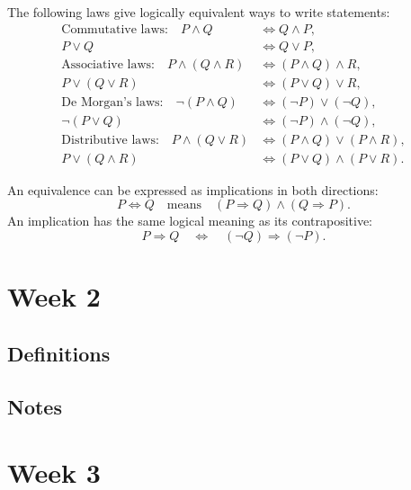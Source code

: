 \documentclass[12pt]{article}
\begin{document}
The following laws give logically equivalent ways to write statements:
\begin{align*}
\text{Commutative laws:}\quad
  P \land Q &\Leftrightarrow Q \land P,\\
  P \lor Q &\Leftrightarrow Q \lor P,\\
\text{Associative laws:}\quad
  P \land (Q \land R) &\Leftrightarrow (P \land Q) \land R,\\
  P \lor (Q \lor R) &\Leftrightarrow (P \lor Q) \lor R,\\
\text{De Morgan's laws:}\quad
  \neg(P \land Q) &\Leftrightarrow (\neg P) \lor (\neg Q),\\
  \neg(P \lor Q) &\Leftrightarrow (\neg P) \land (\neg Q),\\
\text{Distributive laws:}\quad
  P \land (Q \lor R) &\Leftrightarrow (P \land Q) \lor (P \land R),\\
  P \lor (Q \land R) &\Leftrightarrow (P \lor Q) \land (P \lor R).
\end{align*}

An equivalence can be expressed as implications in both directions:
\[
P \Leftrightarrow Q
\quad\text{means}\quad
(P \Rightarrow Q) \land (Q \Rightarrow P).
\]
An implication has the same logical meaning as its contrapositive:
\[
P \Rightarrow Q
\quad\Leftrightarrow\quad
(\neg Q) \Rightarrow (\neg P).
\]





\section{Week 2}

\subsection{Definitions}
\subsection{Notes}



\section{Week 3}
\end{document}
